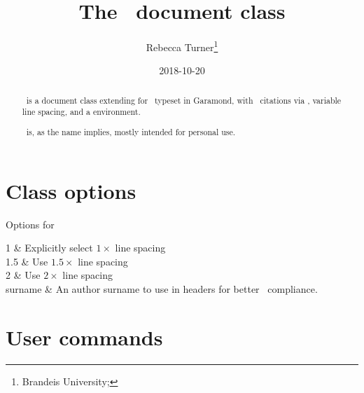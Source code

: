 \documentclass{ltxdoc}
\title{The \re\ document class}
\author{Rebecca Turner\thanks{Brandeis University; \email{rebeccaturner@brandeis.edu}}}
\date{2018-10-20}
\begin{document}
\maketitle

\begin{abstract}
	\re\ is a document class extending  for
	\fontspecok\ typeset in Garamond, with \mla\ citations via
	, variable line spacing, and a 
	environment.

	\re\ is, as the name implies, mostly intended for personal use.
\end{abstract}

\section{Class options}

\begin{table}[h]
	\centering
	\caption{Options for \re}
	\label{tab:rebeccaessayoptions}
	\begin{Optionlist}
		1 & Explicitly select $1\times$ line spacing \\
		1.5 & Use $1.5\times$ line spacing \\
		2 & Use $2\times$ line spacing \\
		surname & An author surname to use in headers for better
			\mla\ compliance.
	\end{Optionlist}
\end{table}

\section{User commands}
\end{document}
